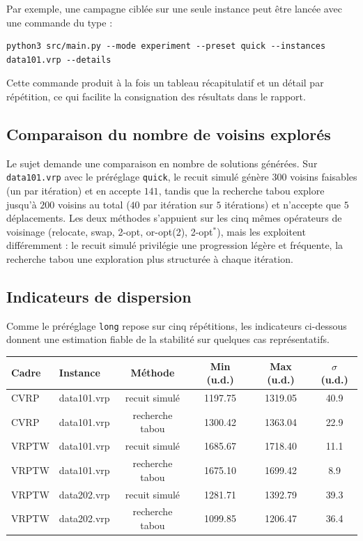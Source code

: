 \documentclass[11pt,a4paper]{article}
\begin{document}
Par exemple, une campagne ciblée sur une seule instance peut être lancée avec une commande du type :
\begin{lstlisting}
python3 src/main.py --mode experiment --preset quick --instances data101.vrp --details
\end{lstlisting}

Cette commande produit à la fois un tableau récapitulatif et un détail par répétition, ce qui facilite la consignation des résultats dans le rapport.

\subsection{Comparaison du nombre de voisins explorés}
Le sujet demande une comparaison en nombre de solutions générées. Sur \texttt{data101.vrp} avec le préréglage \texttt{quick}, le recuit simulé génère \(300\) voisins faisables (un par itération) et en accepte \(141\), tandis que la recherche tabou explore jusqu'à \(200\) voisins au total (\(40\) par itération sur \(5\) itérations) et n'accepte que \(5\) déplacements. Les deux méthodes s'appuient sur les cinq mêmes opérateurs de voisinage (relocate, swap, 2-opt, or-opt(2), 2-opt$^*$), mais les exploitent différemment : le recuit simulé privilégie une progression légère et fréquente, la recherche tabou une exploration plus structurée à chaque itération.

\subsection{Indicateurs de dispersion}
Comme le préréglage \texttt{long} repose sur cinq répétitions, les indicateurs ci-dessous donnent une estimation fiable de la stabilité sur quelques cas représentatifs.

\begin{center}
\begin{tabular}{llcccc}
\toprule
Cadre & Instance & Méthode & Min (u.d.) & Max (u.d.) & \(\sigma\) (u.d.) \\
\midrule
CVRP  & data101.vrp & recuit simulé   & 1197.75 & 1319.05 & 40.9 \\
CVRP  & data101.vrp & recherche tabou & 1300.42 & 1363.04 & 22.9 \\
VRPTW & data101.vrp & recuit simulé   & 1685.67 & 1718.40 & 11.1 \\
VRPTW & data101.vrp & recherche tabou & 1675.10 & 1699.42 &  8.9 \\
VRPTW & data202.vrp & recuit simulé   & 1281.71 & 1392.79 & 39.3 \\
VRPTW & data202.vrp & recherche tabou & 1099.85 & 1206.47 & 36.4 \\
\bottomrule
\end{tabular}
\end{center}
\end{document}
